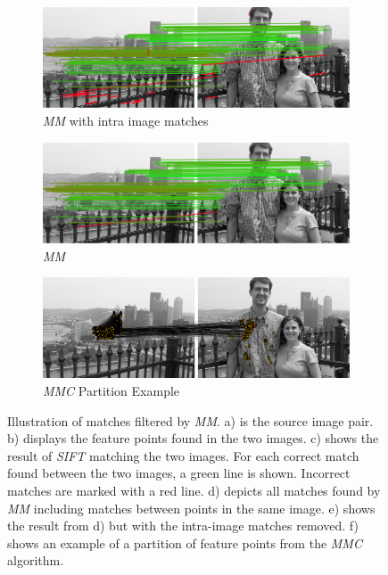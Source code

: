 \documentclass[conference]{IEEEtran}
\begin{document}
\begin{figure}
{\begin{subfigure}[t]{0.32\textwidth}
			\includegraphics[width=\textwidth]{images/mirror_match_with_pruned}
			\caption{\emph{MM} with intra image matches}
			\label{fig:within}
		\end{subfigure}%
		\enspace %
		\begin{subfigure}[t]{0.32\textwidth}
			\centering
			\includegraphics[width=\textwidth]{images/mirror_match}
			\caption{\emph{MM}}
			\label{fig:without}
		\end{subfigure}%
		\enspace%
		\begin{subfigure}[t]{0.32\textwidth}
			\centering
			\includegraphics[width=\textwidth]{images/MMC_partition}
			\caption{\emph{MMC} Partition Example}
			\label{fig:pitts_partition}
		\end{subfigure}%
	}%
	\caption{Illustration of matches filtered by \emph{MM}. a) is the 
		source image pair. b) displays the feature points found in the 
		two images. c) shows the result of \emph{SIFT} matching the two 
		images. For each correct match found between the two images, a 
		green line is shown.  Incorrect matches are marked with a red 
		line. d) depicts all matches found by \emph{MM} including 
	matches between points in the same image. e) shows the result from 
d) but with the intra-image matches removed. f) shows an example of a 
partition of feature points from the \emph{MMC} algorithm.}%
	\label{fig:comparemirror}%
\end{figure}%
\end{document}
